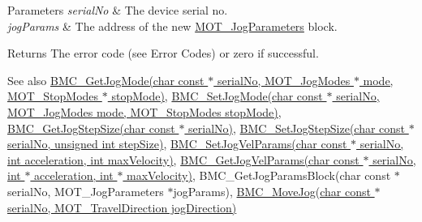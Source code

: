 \begin{DoxyParams}{Parameters}
{\em serial\+No} & The device serial no. \\
\hline
{\em jog\+Params} & The address of the new \hyperlink{struct_m_o_t___jog_parameters}{M\+O\+T\+\_\+\+Jog\+Parameters} block. \\
\hline
\end{DoxyParams}
\begin{DoxyReturn}{Returns}
The error code (see Error Codes) or zero if successful. 
\end{DoxyReturn}
\begin{DoxySeeAlso}{See also}
\hyperlink{group___k_cube_brushless_motor_gafc92fe606b9cd874d7f28d7791e8a06e}{B\+M\+C\+\_\+\+Get\+Jog\+Mode(char const $\ast$ serial\+No, M\+O\+T\+\_\+\+Jog\+Modes $\ast$ mode, M\+O\+T\+\_\+\+Stop\+Modes $\ast$ stop\+Mode)}, \hyperlink{group___k_cube_brushless_motor_ga5cc6ed2932a1761531546d41a9240136}{B\+M\+C\+\_\+\+Set\+Jog\+Mode(char const $\ast$ serial\+No, M\+O\+T\+\_\+\+Jog\+Modes mode, M\+O\+T\+\_\+\+Stop\+Modes stop\+Mode)}, \hyperlink{group___k_cube_brushless_motor_ga2a2db2c5c7f24bbff73f17af4e10bdd1}{B\+M\+C\+\_\+\+Get\+Jog\+Step\+Size(char const $\ast$ serial\+No)}, \hyperlink{group___k_cube_brushless_motor_gaeff03c620c9c2a0719c58dc9d97ed8c3}{B\+M\+C\+\_\+\+Set\+Jog\+Step\+Size(char const $\ast$ serial\+No, unsigned int step\+Size)}, \hyperlink{group___k_cube_brushless_motor_ga5344f441c200c330ef267401054c307e}{B\+M\+C\+\_\+\+Set\+Jog\+Vel\+Params(char const $\ast$ serial\+No, int acceleration, int max\+Velocity)}, \hyperlink{group___k_cube_brushless_motor_ga096d9f530ba9e298f7c687a891b6182f}{B\+M\+C\+\_\+\+Get\+Jog\+Vel\+Params(char const $\ast$ serial\+No, int $\ast$ acceleration, int $\ast$ max\+Velocity)}, B\+M\+C\+\_\+\+Get\+Jog\+Params\+Block(char const $\ast$ serial\+No, M\+O\+T\+\_\+\+Jog\+Parameters $\ast$jog\+Params), \hyperlink{group___k_cube_brushless_motor_gae7854ca7daacf191f792adff135f1dcd}{B\+M\+C\+\_\+\+Move\+Jog(char const $\ast$ serial\+No, M\+O\+T\+\_\+\+Travel\+Direction jog\+Direction)}


\end{DoxySeeAlso}

\begin{DoxyCodeInclude}
\end{DoxyCodeInclude}
